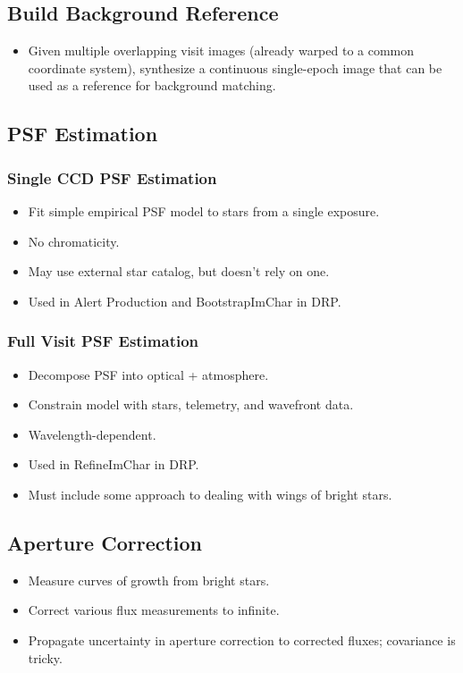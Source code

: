 \subsection{Build Background Reference}
\begin{itemize}
\item Given multiple overlapping visit images (already warped to a common coordinate system), synthesize a continuous single-epoch image that can be used as a reference for background matching.
\end{itemize}

\subsection{PSF Estimation}
\subsubsection{Single CCD PSF Estimation}
\begin{itemize}
\item Fit simple empirical PSF model to stars from a single exposure.
\item No chromaticity.
\item May use external star catalog, but doesn't rely on one.
\item Used in Alert Production and BootstrapImChar in DRP.
\end{itemize}
\subsubsection{Full Visit PSF Estimation}
\begin{itemize}
\item Decompose PSF into optical + atmosphere.
\item Constrain model with stars, telemetry, and wavefront data.
\item Wavelength-dependent.
\item Used in RefineImChar in DRP.
\item Must include some approach to dealing with wings of bright stars.
\end{itemize}

\subsection{Aperture Correction}
\begin{itemize}
\item Measure curves of growth from bright stars.
\item Correct various flux measurements to infinite.
\item Propagate uncertainty in aperture correction to corrected fluxes; covariance is tricky.
\end{itemize}

